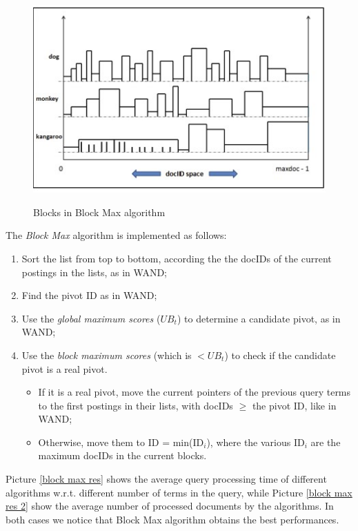 \begin{figure}[h!]
		\centering
		\includegraphics[scale = 1.5]{img/block max.jpg}
		\label{block max}
        \caption{Blocks in Block Max algorithm}
\end{figure}

The \textit{Block Max} algorithm is implemented as follows:

\begin{enumerate}
    \item Sort the list from top to bottom, according the the docIDs of the current postings in the lists, as in WAND;
    \item Find the pivot ID as in WAND;
    \item Use the \textit{global maximum scores} ($UB_t$) to determine a candidate pivot, as in WAND;
    \item Use the \textit{block maximum scores} (which is $< UB_t$) to check if the candidate pivot is a real pivot.
    \begin{itemize}
        \item If it is a real pivot, move the current pointers of the previous query terms to the first postings in their lists, with docIDs $\geq$ the pivot ID, like in WAND;
        \item Otherwise, move them to ID = min(ID$_i$), where the various ID$_i$ are the maximum docIDs in the current blocks.
    \end{itemize}
\end{enumerate}

Picture \ref{block max res} shows the average query processing time of different algorithms w.r.t. different number of terms in the query, while Picture \ref{block max res 2} show the average number of processed documents by the algorithms. In both cases we notice that Block Max algorithm obtains the best performances.

